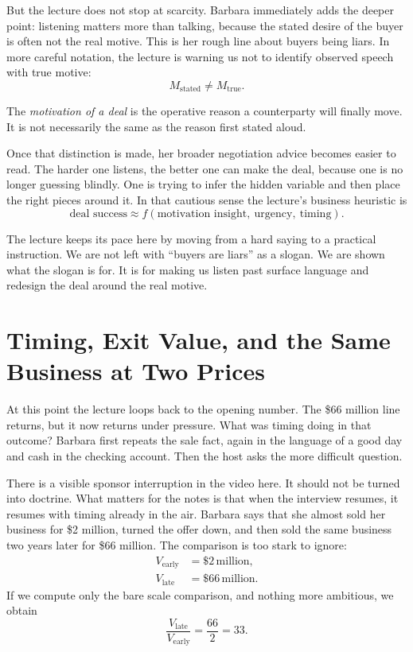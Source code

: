 But the lecture does not stop at scarcity. Barbara immediately adds the deeper point: listening matters more than talking, because the stated desire of the buyer is often not the real motive. This is her rough line about buyers being liars. In more careful notation, the lecture is warning us not to identify observed speech with true motive:
\begin{equation}
M_{\text{stated}} \neq M_{\text{true}}.
\end{equation}

\begin{definition}
The \emph{motivation of a deal} is the operative reason a counterparty will finally move. It is not necessarily the same as the reason first stated aloud.
\end{definition}

Once that distinction is made, her broader negotiation advice becomes easier to read. The harder one listens, the better one can make the deal, because one is no longer guessing blindly. One is trying to infer the hidden variable and then place the right pieces around it. In that cautious sense the lecture's business heuristic is
\begin{equation}
\text{deal success}\approx f(\text{motivation insight},\ \text{urgency},\ \text{timing}).
\end{equation}

The lecture keeps its pace here by moving from a hard saying to a practical instruction. We are not left with ``buyers are liars'' as a slogan. We are shown what the slogan is for. It is for making us listen past surface language and redesign the deal around the real motive.

\section{Timing, Exit Value, and the Same Business at Two Prices}

At this point the lecture loops back to the opening number. The \$66 million line returns, but it now returns under pressure. What was timing doing in that outcome? Barbara first repeats the sale fact, again in the language of a good day and cash in the checking account. Then the host asks the more difficult question.

There is a visible sponsor interruption in the video here. It should not be turned into doctrine. What matters for the notes is that when the interview resumes, it resumes with timing already in the air. Barbara says that she almost sold her business for \$2 million, turned the offer down, and then sold the same business two years later for \$66 million. The comparison is too stark to ignore:
\begin{align}
V_{\text{early}} &= \$2\,\text{million},\\
V_{\text{late}}  &= \$66\,\text{million}.
\end{align}
If we compute only the bare scale comparison, and nothing more ambitious, we obtain
\begin{equation}
\frac{V_{\text{late}}}{V_{\text{early}}}=\frac{66}{2}=33.
\end{equation}

